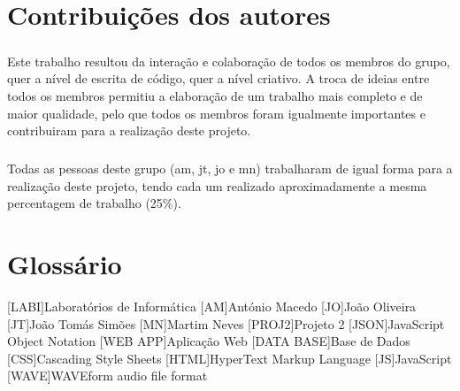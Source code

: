 \documentclass[a4paper]{report}
\begin{document}
\chapter{Contribuições dos autores}
\paragraph{}Este trabalho resultou da interação e colaboração de todos os membros do grupo, quer a nível de escrita de código, quer a nível criativo. A troca de ideias entre todos os membros permitiu a elaboração de um trabalho mais completo e de maior qualidade, pelo que todos os membros foram igualmente importantes e contribuiram para a realização deste projeto.

\paragraph{}Todas as pessoas deste grupo (\ac{am}, \ac{jt}, \ac{jo} e \ac{mn}) trabalharam de igual forma para a realização deste projeto, tendo cada um realizado aproximadamente a mesma percentagem de trabalho (25\%).

\chapter{Glossário}
\begin{acronym}
[LABI]{Laboratórios de Informática}
[AM]{António Macedo}
[JO]{João Oliveira}
[JT]{João Tomás Simões}
[MN]{Martim Neves}
[PROJ2]{Projeto 2}
[JSON]{JavaScript Object Notation}
[WEB APP]{Aplicação Web}
[DATA BASE]{Base de Dados}
[CSS]{Cascading Style Sheets}
[HTML]{HyperText Markup Language}
[JS]{JavaScript}
[WAVE]{WAVEform audio file format}
\end{acronym}



\end{document}
